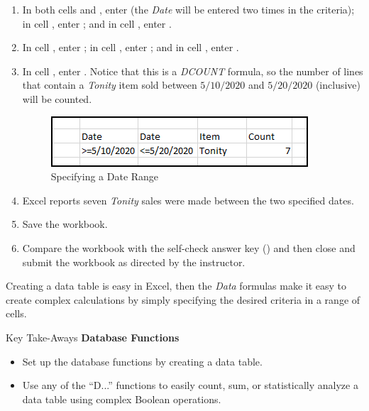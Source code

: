 \begin{enumerate}
	\item In both cells  and , enter  (the \textit{Date} will be entered two times in the criteria); in cell , enter ; and in cell , enter .
	\item In cell , enter ; in cell , enter ; and in cell , enter .
	\item In cell , enter  . Notice that this is a \textit{DCOUNT} formula, so the number of lines that contain a \textit{Tonity} item sold between $ 5/10/2020 $ and $ 5/20/2020 $ (inclusive) will be counted.
	
	\begin{figure}[H]
		\centering
		\includegraphics[width=\maxwidth{.95\linewidth}]{gfx/ch09_fig24}
		\caption{Specifying a Date Range}
		\label{09:fig24}
	\end{figure}

	\item Excel reports seven \textit{Tonity} sales were made between the two specified dates.
	\item Save the  workbook.
	\item Compare the workbook with the self-check answer key () and then close and submit the  workbook as directed by the instructor.

\end{enumerate}

Creating a data table is easy in Excel, then the \textit{Data} formulas make it easy to create complex calculations by simply specifying the desired criteria in a range of cells.
	
\begin{center}
	\begin{tkwbox}{Key Take-Aways}
		\textbf{Database Functions}
		\\
		\begin{itemize}
			\setlength{\itemsep}{0pt}
			\setlength{\parskip}{0pt}
			\setlength{\parsep}{0pt}
			
			\item Set up the database functions by creating a data table.
			\item Use any of the ``D...'' functions to easily count, sum, or statistically analyze a data table using complex Boolean operations. 
			
		\end{itemize}
	\end{tkwbox}
\end{center}

